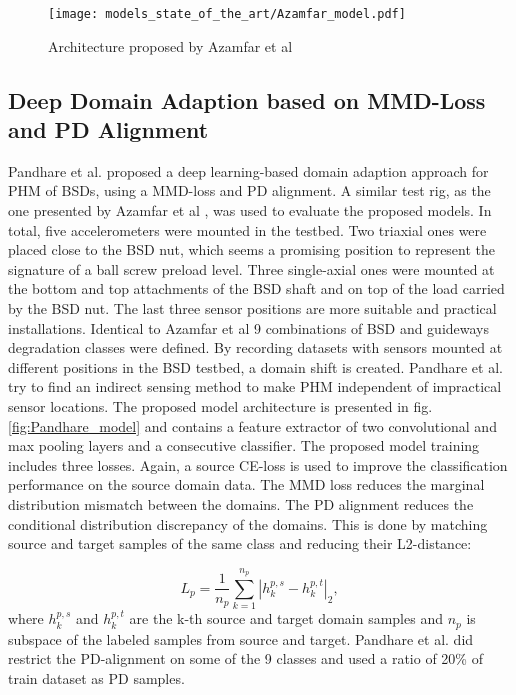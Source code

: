\begin{figure}[H]
  \centering
  \texttt{[image: models\_state\_of\_the\_art/Azamfar\_model.pdf]}
  \caption{Architecture proposed by Azamfar et al \cite{AZAMFAR2020103932}}
  \label{fig:Azamfar_model}
\end{figure}


\subsection{Deep Domain Adaption based on MMD-Loss and PD Alignment}
Pandhare et al. \cite{Pandhare2021} proposed a deep learning-based domain adaption approach for PHM of BSDs, using a MMD-loss and PD alignment. A similar test rig, as the one presented by Azamfar et al \cite{AZAMFAR2020103932}, was used to evaluate the proposed models. In total, five accelerometers were mounted in the testbed. Two triaxial ones were placed close to the BSD nut, which seems a promising position to represent the signature of a ball screw preload level. Three single-axial ones were mounted at the bottom and top attachments of the BSD shaft and on top of the load carried by the BSD nut. The last three sensor positions are more suitable and practical installations. Identical to Azamfar et al \cite{AZAMFAR2020103932} 9 combinations of BSD and guideways degradation classes were defined. By recording datasets with sensors mounted at different positions in the BSD testbed, a domain shift is created. Pandhare et al. try to find an indirect sensing method to make PHM independent of impractical sensor locations. The proposed model architecture is presented in fig. \ref{fig:Pandhare_model} and contains a feature extractor of two convolutional and max pooling layers and a consecutive classifier. The proposed model training includes three losses. Again, a source CE-loss is used to improve the classification performance on the source domain data. The MMD loss reduces the marginal distribution mismatch between the domains. The PD alignment reduces the conditional distribution discrepancy of the domains. This is done by matching source and target samples of the same class and reducing their L2-distance: 

\begin{equation}
    L_{p} = \frac{1}{n_{p}}\sum_{k=1}^{n_{p}}|h_{k}^{p,s}-h_{k}^{p,t}|_{2}, 
\end{equation}
where $h_{k}^{p,s}$ and $h_{k}^{p,t}$ are the k-th source and target domain samples and $n_{p}$ is subspace of the labeled samples from source and target. Pandhare et al. did restrict the PD-alignment on some of the 9 classes and used a ratio of 20\% of train dataset as PD samples. 


